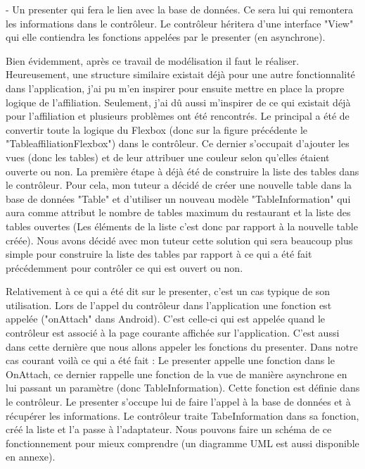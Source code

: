 - Un presenter qui fera le lien avec la base de données. Ce sera lui qui remontera les informations dans le contrôleur. Le contrôleur héritera d'une interface "View" qui elle contiendra les fonctions appelées par le presenter (en asynchrone).

Bien évidemment, après ce travail de modélisation il faut le réaliser. Heureusement, une structure similaire existait déjà pour une autre fonctionnalité dans l'application, j'ai pu m'en inspirer pour ensuite mettre en place la propre logique de l'affiliation. Seulement, j'ai dû aussi m'inspirer de ce qui existait déjà pour l'affiliation et plusieurs problèmes ont été rencontrés. Le principal a été de convertir toute la logique du Flexbox (donc sur la figure précédente le "TableaffiliationFlexbox") dans le contrôleur.  Ce dernier s'occupait d'ajouter les vues (donc les tables) et de leur attribuer une couleur selon qu'elles étaient ouverte ou non. La première étape à déjà été de construire la liste des tables dans le contrôleur. Pour cela, mon tuteur a décidé de créer une nouvelle table dans la base de données "Table" et d'utiliser un nouveau modèle "TableInformation" qui aura comme attribut le nombre de tables maximum du restaurant et la liste des tables ouvertes (Les éléments de la liste c'est donc par rapport à la nouvelle table créée). Nous avons décidé avec mon tuteur cette solution qui sera beaucoup plus simple pour construire la liste des tables par rapport à ce qui a été fait précédemment pour contrôler ce qui est ouvert ou non. 

Relativement à ce qui a été dit sur le presenter, c'est un cas typique de son utilisation. Lors de l'appel du contrôleur dans l'application une fonction est appelée ("onAttach" dans Android). C'est celle-ci qui est appelée quand le contrôleur est associé à la page courante affichée sur l'application. C'est aussi dans cette dernière que nous allons appeler les fonctions du presenter. Dans notre cas courant voilà ce qui a été fait : Le presenter appelle une fonction dans le OnAttach, ce dernier rappelle une fonction de la vue de manière asynchrone en lui passant un paramètre (donc TableInformation). Cette fonction est définie dans le contrôleur. Le presenter s'occupe lui de faire l'appel à la base de données et à récupérer les informations. Le contrôleur traite TabeInformation dans sa fonction, créé la liste et l'a passe à l'adaptateur. Nous pouvons faire un schéma de ce fonctionnement pour mieux comprendre (un diagramme UML est aussi disponible en annexe).

\clearpage


